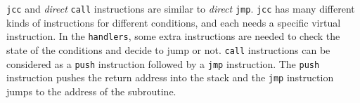 \begin{table}[!ht]
\renewcommand{\arraystretch}{1.1}
\tbl{The Virtual Instructions and Handlers of \texttt{jmp} Instructions.\label{tab:jmp}}{ %
\begin{tabular}{|c|l|}
\hline
VI                           & Handler      \\ \hline \hline %
\texttt{jmp\underline{ }di}  & \emph{;operand: addr of the dest. bytecode instr.}        \\
                             & \texttt{pop eax} \emph{;get operand}                \\
                             & \texttt{mov VPC, eax}                                                \\ \hline
\texttt{jmp\underline{ }do}  & \emph{;operand: addr of the dest. native instr.}          \\
                             & \texttt{pop [mem]} \emph{;get operand}               \\
                             & \texttt{...} \emph{;restore native context}                         \\
                             & \texttt{jmp dword [mem]}                                             \\ \hline
\end{tabular}}
\begin{tabnote}
\end{tabnote}
\end{table}

\texttt{jcc} and \textit{direct} \texttt{call} instructions are similar to \textit{direct} \texttt{jmp}. \texttt{jcc} has many different kinds of instructions for different conditions, and each needs a specific virtual instruction. In the \texttt{handlers}, some extra instructions are needed to check the state of the conditions and decide to jump or not. \texttt{call} instructions can be considered as a \texttt{push} instruction followed by a \texttt{jmp} instruction. The \texttt{push} instruction pushes the return address into the stack and the \texttt{jmp} instruction jumps to the address of the subroutine.


